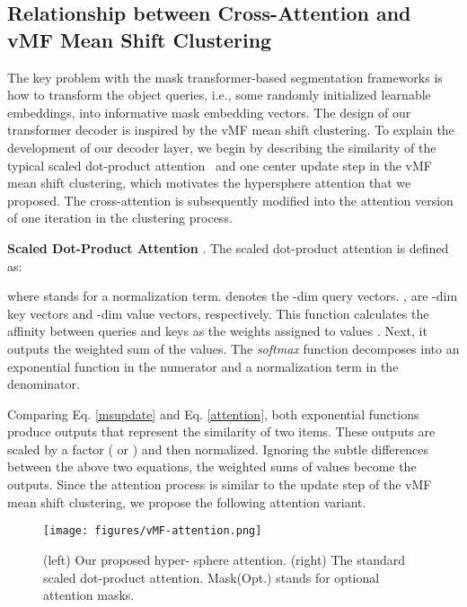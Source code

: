 \documentclass[letterpaper, 10 pt, conference]{ieeeconf}
\begin{document}
\vspace{-2mm}
\subsection{Relationship between Cross-Attention and vMF Mean Shift Clustering}




The key problem with the mask transformer-based segmentation frameworks is how to transform the object queries, i.e., some randomly initialized learnable embeddings, into informative mask embedding vectors.  The design of our transformer decoder is inspired by the vMF mean shift clustering. To explain the development of our decoder layer, we begin by describing the similarity of the typical scaled dot-product attention~\cite{vaswani2017attention} and one center update step in the vMF mean shift clustering, which motivates the hypersphere attention that we proposed. The cross-attention is subsequently modified into the attention version of one iteration in the clustering process.

\textbf{Scaled Dot-Product Attention} \cite{vaswani2017attention}. The scaled dot-product attention is defined as:
\vspace{-4mm}

where  stands for a normalization term.  denotes the  -dim query vectors. ,  are  -dim key vectors and  -dim value vectors, respectively. This function calculates the affinity between queries  and keys  as the weights assigned to values . Next, it outputs the weighted sum of the values. The \textit{softmax} function decomposes into an exponential function in the numerator and a normalization term in the denominator. 

Comparing Eq. \eqref{msupdate} and Eq. \eqref{attention}, both exponential functions produce outputs that represent the similarity of two items. These outputs are scaled by a factor ( or ) and then normalized. Ignoring the subtle differences between the above two equations, the weighted sums of values become the outputs. Since the attention process is similar to the update step of the vMF mean shift clustering, we propose the following attention variant.



\begin{figure}
    \centering
\texttt{[image: figures/vMF-attention.png]}
    \vspace{-4mm}
    \caption{ (left) Our proposed hyper-
sphere attention. (right) The standard
scaled dot-product attention. Mask(Opt.) stands for optional attention masks.}
    \label{fig:attention}
    \vspace{-6mm}
\end{figure}
\end{document}
